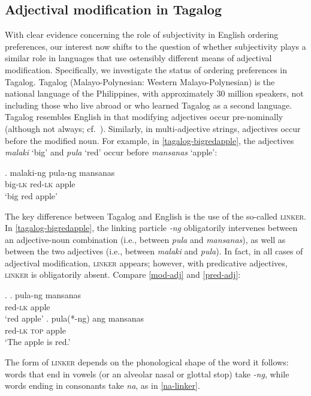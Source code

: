 \documentclass[12pt,letterpaper]{article}
\begin{document}
\subsection{Adjectival modification in Tagalog}

With clear evidence concerning the role of subjectivity in English ordering preferences, our interest now shifts to the question of whether subjectivity plays a similar role in languages that use ostensibly different means of adjectival modification. Specifically, we investigate the status of ordering preferences in Tagalog. Tagalog (Malayo-Polynesian: Western Malayo-Polynesian) is the national language of the Philippines, with approximately 30 million speakers, not including those who live abroad or who learned Tagalog as a second language. Tagalog resembles English in that modifying adjectives occur pre-nominally (although not always; cf.~\citealp{schachterotanes1972,rubin1994,shihzuraw2017}). Similarly, in multi-adjective strings, adjectives occur before the modified noun. For example, in \ref{tagalog-bigredapple}, the adjectives \emph{malaki} `big' and \emph{pula} `red' occur before \emph{mansanas} `apple':

\exg. malaki-ng pula-ng mansanas\\
 big-\textsc{lk} red-\textsc{lk} apple\\
`big red apple' \label{tagalog-bigredapple}


The key difference between Tagalog and English is the use of the so-called \textsc{linker}. In \ref{tagalog-bigredapple}, the linking particle \emph{-ng} obligatorily intervenes between an adjective-noun combination (i.e., between \emph{pula} and \emph{mansanas}), as well as between the two adjectives (i.e., between \emph{malaki} and \emph{pula}). In fact, in all cases of adjectival modification, \textsc{linker} appears; however, with predicative adjectives, \textsc{linker} is obligatorily absent. Compare \ref{mod-adj} and \ref{pred-adj}:

\ex. \ag. pula-ng mansanas\\
red-\textsc{lk} apple\\
`red apple' \label{mod-adj}
\bg. pula(*-ng) ang mansanas\\
red-\textsc{lk} \textsc{top} apple\\
`The apple is red.' \label{pred-adj}

The form of \textsc{linker} depends on the phonological shape of the word it follows: words that end in vowels (or an alveolar nasal or glottal stop) take \emph{-ng}, while words ending in consonants take \emph{na}, as in \ref{na-linker}.
\end{document}
